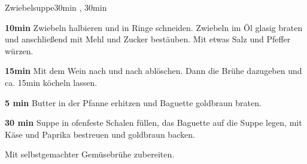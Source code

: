 \documentclass[../recipe-collections/cooking.tex]{subfiles}
\begin{document}
\begin{recipe}{Zwiebelsuppe}{}{30min , 30min }

  \freeform{}\textit{}


  \textbf{10min}
  Zwiebeln halbieren und in Ringe schneiden.
  Zwiebeln im Öl glasig braten und anschließend mit Mehl und Zucker bestäuben.
  Mit etwas Salz und Pfeffer würzen.


  \textbf{15min}
  Mit dem Wein nach und nach ablöschen.
  Dann die Brühe dazugeben und ca. 15min köcheln lassen.


  \textbf{5 min}
  Butter in der Pfanne erhitzen und Baguette goldbraun braten.


  \textbf{30 min}
  Suppe in ofenfeste Schalen füllen, das Baguette auf die Suppe legen, mit Käse und Paprika bestreuen und goldbraun backen.

  \freeform{}\hrulefill{}

  \freeform{}
  Mit selbstgemachter Gemüsebrühe zubereiten.

\end{recipe}
\end{document}
